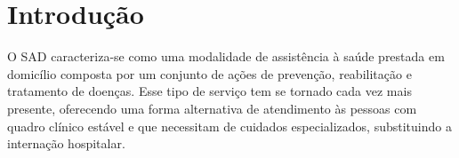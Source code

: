 



\section{\esp Introdução \label{introducao}}

O \ac{SAD} caracteriza-se como uma modalidade de assistência à saúde prestada em domicílio composta por um conjunto de ações de prevenção, reabilitação e tratamento de doenças.
Esse tipo de serviço tem se tornado cada vez mais presente, oferecendo uma forma alternativa de atendimento às pessoas com quadro clínico estável e que necessitam de cuidados especializados, substituindo a internação hospitalar.


